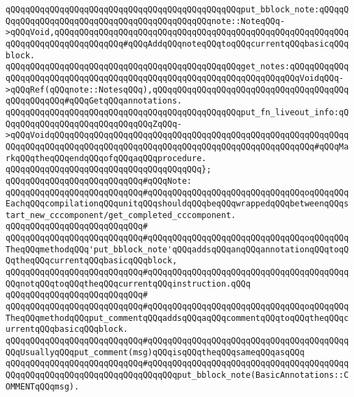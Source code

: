 \verb|qQQqqQQqqQQqqQQqqQQqqQQqqQQqqQQqqQQqqQQqqQQqqQQqput_bblock_note:qQQqqQQqqQQqqQQqqQQqqQQqqQQqqQQqqQQqqQQqqQQqqQQqnote::NoteqQQq->qQQqVoid,qQQqqQQqqQQqqQQqqQQqqQQqqQQqqQQqqQQqqQQqqQQqqQQqqQQqqQQqqQQqqQQqqQQqqQQqqQQqqQQqqQQq#qQQqAddqQQqnoteqQQqtoqQQqcurrentqQQqbasicqQQqblock.|\newline
\verb|qQQqqQQqqQQqqQQqqQQqqQQqqQQqqQQqqQQqqQQqqQQqqQQqget_notes:qQQqqQQqqQQqqQQqqQQqqQQqqQQqqQQqqQQqqQQqqQQqqQQqqQQqqQQqqQQqqQQqqQQqqQQqVoidqQQq->qQQqRef(qQQqnote::NotesqQQq),qQQqqQQqqQQqqQQqqQQqqQQqqQQqqQQqqQQqqQQqqQQqqQQqqQQq#qQQqGetqQQqannotations.|\newline
\verb|qQQqqQQqqQQqqQQqqQQqqQQqqQQqqQQqqQQqqQQqqQQqqQQqput_fn_liveout_info:qQQqqQQqqQQqqQQqqQQqqQQqqQQqqQQqZqQQq->qQQqVoidqQQqqQQqqQQqqQQqqQQqqQQqqQQqqQQqqQQqqQQqqQQqqQQqqQQqqQQqqQQqqQQqqQQqqQQqqQQqqQQqqQQqqQQqqQQqqQQqqQQqqQQqqQQqqQQqqQQqqQQqqQQq#qQQqMarkqQQqtheqQQqendqQQqofqQQqaqQQqprocedure.|\newline
\verb|qQQqqQQqqQQqqQQqqQQqqQQqqQQqqQQqqQQqqQQq};|\newline
\newline
\verb|qQQqqQQqqQQqqQQqqQQqqQQqqQQq#qQQqNote:|\newline
\verb|qQQqqQQqqQQqqQQqqQQqqQQqqQQq#qQQqqQQqqQQqqQQqqQQqqQQqqQQqqQQqoqQQqqQQqEachqQQqcompilationqQQqunitqQQqshouldqQQqbeqQQqwrappedqQQqbetweenqQQqstart_new_cccomponent/get_completed_cccomponent.|\newline
\verb|qQQqqQQqqQQqqQQqqQQqqQQqqQQq#|\newline
\verb|qQQqqQQqqQQqqQQqqQQqqQQqqQQq#qQQqqQQqqQQqqQQqqQQqqQQqqQQqqQQqoqQQqqQQqTheqQQqmethodqQQq'put_bblock_note'qQQqaddsqQQqanqQQqannotationqQQqtoqQQqtheqQQqcurrentqQQqbasicqQQqblock,|\newline
\verb|qQQqqQQqqQQqqQQqqQQqqQQqqQQq#qQQqqQQqqQQqqQQqqQQqqQQqqQQqqQQqqQQqqQQqqQQqnotqQQqtoqQQqtheqQQqcurrentqQQqinstruction.qQQq|\newline
\verb|qQQqqQQqqQQqqQQqqQQqqQQqqQQq#|\newline
\verb|qQQqqQQqqQQqqQQqqQQqqQQqqQQq#qQQqqQQqqQQqqQQqqQQqqQQqqQQqqQQqoqQQqqQQqTheqQQqmethodqQQqput_commentqQQqaddsqQQqaqQQqcommentqQQqtoqQQqtheqQQqcurrentqQQqbasicqQQqblock.|\newline
\verb|qQQqqQQqqQQqqQQqqQQqqQQqqQQq#qQQqqQQqqQQqqQQqqQQqqQQqqQQqqQQqqQQqqQQqqQQqUsuallyqQQqput_comment(msg)qQQqisqQQqtheqQQqsameqQQqasqQQq|\newline
\verb|qQQqqQQqqQQqqQQqqQQqqQQqqQQq#qQQqqQQqqQQqqQQqqQQqqQQqqQQqqQQqqQQqqQQqqQQqqQQqqQQqqQQqqQQqqQQqqQQqqQQqqQQqput_bblock_note(BasicAnnotations::COMMENTqQQqmsg).|\newline
